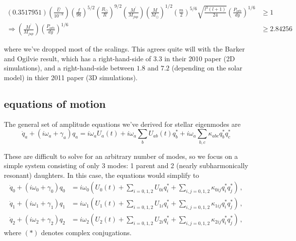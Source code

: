 \begin{subequations}
\begin{align}
(0.3517951)\left(\frac{\hat{U}}{10^{-8}}\right) \left(\frac{f}{98}\right)^{5/2} \left(\frac{R_\odot}{R}\right)^{9/2} \left(\frac{M^\prime}{M_{jup}}\right) \left(\frac{M}{M_\odot}\right)^{1/2} \left(\frac{m}{2}\right)^{5/6} \sqrt{\frac{l^3(l+1)}{24}} \left(\frac{P_\mathrm{orb}}{dy}\right)^{1/6} & \geq 1 \\
\Rightarrow \left(\frac{M^\prime}{M_{jup}}\right) \left(\frac{P_\mathrm{orb}}{dy}\right)^{1/6} & \geq 2.84256
\end{align}
\end{subequations}

where we've dropped most of the scalings. This agrees quite will with the Barker and Ogilvie result, which has a right-hand-side of $3.3$ in their 2010 paper (2D simulations), and a right-hand-side between $1.8$ and $7.2$ (depending on the solar model) in thier 2011 paper (3D simulations).

\subsection*{equations of motion}

The general set of amplitude equations we've derived for stellar eigenmodes are
\begin{equation}\label{eq:general_amplitude_eqn's}
\dot{q}_a + (i\omega_a + \gamma_a)q_a = i\omega_a U_a(t) + i\omega_a \sum_b U_{ab}(t) q_b^\ast + i\omega_a \sum_{b,c} \kappa_{abc} q_b^\ast q_c^\ast
\end{equation}

These are difficult to solve for an arbitrary number of modes, so we focus on a simple system consisting of only 3 modes: 1 parent and 2 (nearly subharmonically resonant) daughters. In this case, the equations would simplify to
\begin{subequations}\label{eq:3mode_amplitude_eqn's}
\begin{align}
\dot{q}_0 + (i\omega_0 + \gamma_0)q_0 & = i\omega_0 \left( U_0(t) + \sum_{i=0,1,2} U_{0i} q_i^\ast + \sum_{i,j=0,1,2} \kappa_{0ij} q_i^\ast q_j^\ast \right) \,,\\
\dot{q}_1 + (i\omega_1 + \gamma_1)q_1 & = i\omega_1 \left( U_1(t) + \sum_{i=0,1,2} U_{1i} q_i^\ast + \sum_{i,j=0,1,2} \kappa_{1ij} q_i^\ast q_j^\ast \right) \,,\\
\dot{q}_2 + (i\omega_2 + \gamma_2)q_2 & = i\omega_2 \left( U_2(t) + \sum_{i=0,1,2} U_{2i} q_i^\ast + \sum_{i,j=0,1,2} \kappa_{2ij} q_i^\ast q_j^\ast \right) \,,
\end{align}
\end{subequations}
where $(\ast)$ denotes complex conjugations.

